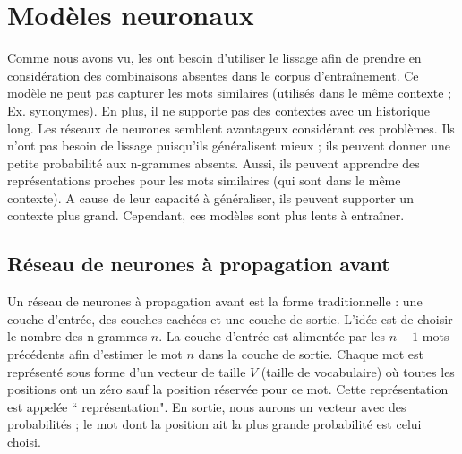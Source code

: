 \documentclass{KodeBook}
\begin{document}
\section{Modèles neuronaux}

Comme nous avons vu, les  ont besoin d'utiliser le lissage afin de prendre en considération des combinaisons absentes dans le corpus d'entraînement. 
Ce modèle ne peut pas capturer les mots similaires (utilisés dans le même contexte ; Ex. synonymes). 
En plus, il ne supporte pas des contextes avec un historique long. 
Les réseaux de neurones semblent avantageux considérant ces problèmes. 
Ils n'ont pas besoin de lissage puisqu'ils généralisent mieux ; ils peuvent donner une petite probabilité aux n-grammes absents. 
Aussi, ils peuvent apprendre des représentations proches pour les mots similaires (qui sont dans le  même contexte). 
A cause de leur capacité à généraliser, ils peuvent supporter un contexte plus grand. 
Cependant, ces modèles sont plus lents à entraîner.

\subsection{Réseau de neurones à propagation avant}

Un réseau de neurones à propagation avant est la forme traditionnelle : une couche d'entrée, des couches cachées et une couche de sortie. 
L'idée est de choisir le nombre des n-grammes $n$. 
La couche d'entrée est alimentée par les $n-1$ mots précédents afin d'estimer le mot $n$ dans la couche de sortie. 
Chaque mot est représenté sous forme d'un vecteur de taille $V$ (taille de vocabulaire) où toutes les positions ont un zéro sauf la position réservée pour ce mot. 
Cette représentation est appelée `` représentation". 
En sortie, nous aurons un vecteur avec des probabilités ; le mot dont la position ait la plus grande probabilité est celui choisi. 
\end{document}
